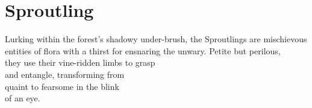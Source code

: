 \section*{Sproutling}\label{sec:Sproutling}
Lurking within the forest's shadowy under-brush, the Sproutlings are mischievous entities of flora with a thirst for ensnaring the unwary. Petite but perilous,\\they use their vine-ridden limbs to grasp\\and entangle, transforming from\\quaint to fearsome in the blink\\of an eye.
